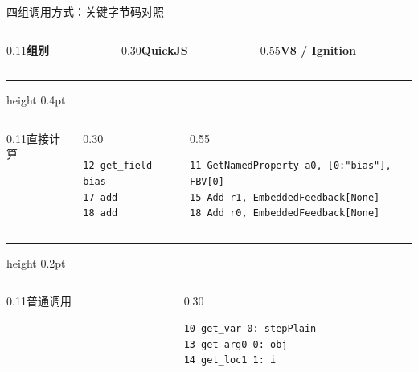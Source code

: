 \documentclass[UTF8,aspectratio=169,10pt,fontset=fandol]{ctexbeamer}
\begin{document}
\begin{frame}[fragile,t]{四组调用方式：关键字节码对照}
\begingroup
\setlength{\parskip}{0pt}
\fontsize{10}{11.5}\selectfont
\begin{columns}[T,onlytextwidth]
  \begin{column}{0.11\textwidth}\textbf{组别}\end{column}
  \begin{column}{0.30\textwidth}\textbf{QuickJS}\end{column}
  \begin{column}{0.55\textwidth}\textbf{V8 / Ignition}\end{column}
\end{columns}
\par\vspace{2pt}\hrule height 0.4pt\vspace{3pt}
\begin{columns}[T,onlytextwidth]
  \begin{column}{0.11\textwidth}直接计算\end{column}
  \begin{column}{0.30\textwidth}
\begin{lstlisting}
12 get_field bias
17 add
18 add
\end{lstlisting}
  \end{column}
  \begin{column}{0.55\textwidth}
\begin{lstlisting}
11 GetNamedProperty a0, [0:"bias"], FBV[0]
15 Add r1, EmbeddedFeedback[None]
18 Add r0, EmbeddedFeedback[None]
\end{lstlisting}
  \end{column}
\end{columns}
\par\vspace{3pt}\hrule height 0.2pt\vspace{3pt}
\begin{columns}[T,onlytextwidth]
  \begin{column}{0.11\textwidth}普通调用\end{column}
  \begin{column}{0.30\textwidth}
\begin{lstlisting}
10 get_var 0: stepPlain
13 get_arg0 0: obj
14 get_loc1 1: i

\end{lstlisting}
\end{column}
\end{columns}
\end{frame}
\end{document}
